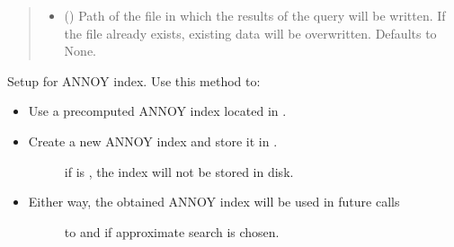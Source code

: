 \documentclass[letterpaper,10pt,english]{sphinxmanual}
\begin{document}
\begin{fulllineitems}
\begin{fulllineitems}
\begin{quote}
\begin{description}
\begin{itemize}
\item {} 
 (\sphinxstyleliteralemphasis{\sphinxupquote{, }}) \textendash{} Path of the file in which the results of the query will be
written. If the file already exists, existing data will be overwritten.
Defaults to None.

\end{itemize}

\end{description}\end{quote}

\end{fulllineitems}


\begin{fulllineitems}
\label{\detokenize{code:semantic_search.SemanticSearch.setup_annoy}}
Setup for ANNOY index. Use this method to:
\begin{itemize}
\item {} 
Use a precomputed ANNOY index located in .

\item {} \begin{description}
\item[{Create a new ANNOY index and store it in . }] \leavevmode
if  is , the index will not be stored in disk.

\end{description}

\item {} \begin{description}
\item[{Either way, the obtained ANNOY index will be used in future calls }] \leavevmode
to  and  if approximate search is chosen.

\end{description}


\end{itemize}
\end{fulllineitems}
\end{fulllineitems}
\end{document}
